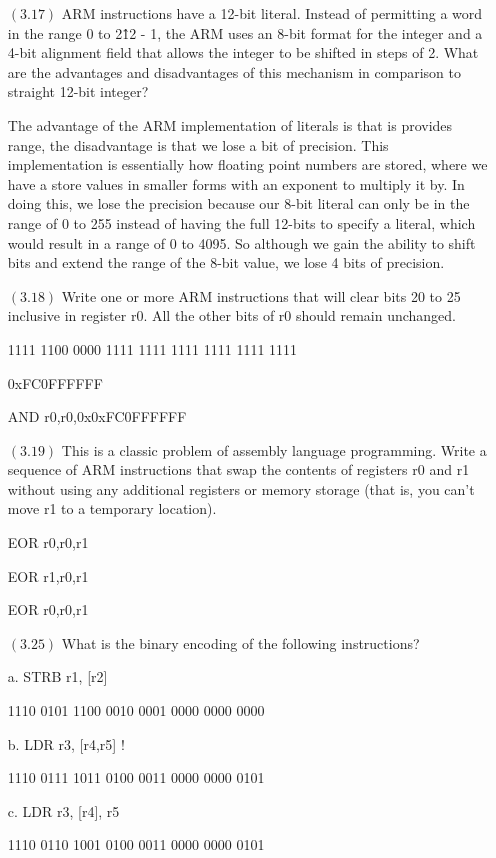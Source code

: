 \documentclass[letterpaper,10pt,titlepage]{article}
\begin{document}
\begin{enumerate}
\item[$(3.17)$]ARM instructions have a 12-bit literal. Instead of permitting a word in the range 0 to 2\^12 - 1, the ARM uses an 8-bit format for the integer and a 4-bit alignment field that allows the integer to be shifted in steps of 2. What are the advantages and disadvantages of this mechanism in comparison to straight 12-bit integer?

The advantage of the ARM implementation of literals is that is provides range, the disadvantage is that we lose a bit of precision. This implementation is essentially how floating point numbers are stored, where we have a store values in smaller forms with an exponent to multiply it by. In doing this, we lose the precision because our 8-bit literal can only be in the range of 0 to 255 instead of having the full 12-bits to specify a literal, which would result in a range of 0 to 4095. So although we gain the ability to shift bits and extend the range of the 8-bit value, we lose 4 bits of precision.


\item[$(3.18)$]Write one or more ARM instructions that will clear bits 20 to 25 inclusive in register r0. All the other bits of r0 should remain unchanged.

1111 1100 0000 1111 1111 1111 1111 1111 1111

0xFC0FFFFFF

AND r0,r0,0x0xFC0FFFFFF


\item[$(3.19)$]This is a classic problem of assembly language programming. Write a sequence of ARM instructions that swap the contents of registers r0 and r1 without using any additional registers or memory storage (that is, you can't move r1 to a temporary location).

EOR r0,r0,r1

EOR r1,r0,r1

EOR r0,r0,r1


\item[$(3.25)$]What is the binary encoding of the following instructions?

a. STRB r1, [r2]

1110 0101 1100 0010 0001 0000 0000 0000

b. LDR r3, [r4,r5] !

1110 0111 1011 0100 0011 0000 0000 0101 

c. LDR r3, [r4], r5

1110 0110 1001 0100 0011 0000 0000 0101


\end{enumerate}
\end{document}

